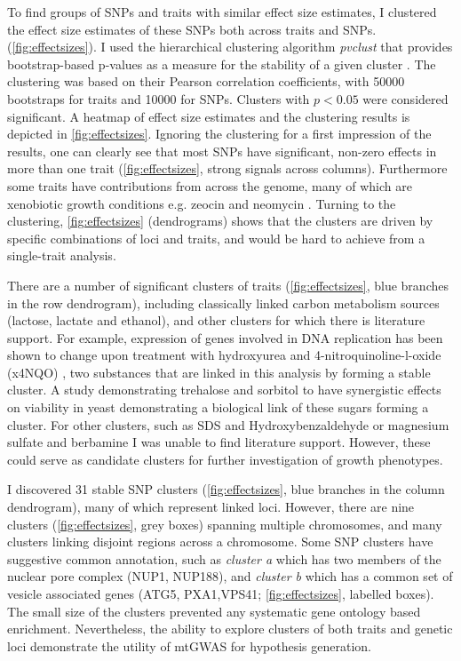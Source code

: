 To find groups of SNPs and traits with similar effect size estimates, I clustered the effect size estimates of these SNPs both across traits and SNPs. (\cref{fig:effectsizes}). I used the hierarchical clustering algorithm \textit{pvclust} that provides bootstrap-based p-values as a measure for the stability of a given cluster \citep{Suzuki2006}. The clustering was based on their Pearson correlation coefficients, with \num{50000} bootstraps for traits and \num{10000} for SNPs. Clusters with \(p < 0.05\) were considered significant. A heatmap of effect size estimates and the clustering results is depicted in \cref{fig:effectsizes}. Ignoring the clustering for a first impression of the results, one can clearly see that most SNPs have significant, non-zero effects in more than one trait (\cref{fig:effectsizes}, strong signals across columns). Furthermore some traits have contributions from across the genome, many of which are xenobiotic growth conditions e.g. zeocin \citep{Krol2015} and neomycin \citep{Foiani2010}. Turning to the clustering, \cref{fig:effectsizes} (dendrograms) shows that the clusters are driven by specific combinations of loci and traits, and would be hard to achieve from a single-trait analysis. 

There are a number of significant clusters of traits (\cref{fig:effectsizes}, blue branches in the row dendrogram), including classically linked carbon metabolism sources (lactose, lactate and ethanol), and other clusters for which there is literature support. For example, expression of genes involved in DNA replication has been shown to change upon treatment with hydroxyurea and \num{4}-nitroquinoline-l-oxide (x4NQO) \citep{Elledge1990}, two substances that are linked in this analysis by forming a stable cluster. A study demonstrating trehalose and sorbitol to have synergistic effects on viability in yeast \citep{Hua2015} demonstrating a biological link of these sugars forming a cluster. For other clusters, such as SDS and Hydroxybenzaldehyde or magnesium sulfate and berbamine I was unable to find literature support. However, these could serve as candidate clusters for further investigation of growth phenotypes.

I discovered \num{31} stable SNP clusters (\cref{fig:effectsizes}, blue branches in the column dendrogram), many of which represent linked loci. However, there are nine clusters (\cref{fig:effectsizes}, grey boxes) spanning multiple chromosomes, and many clusters linking disjoint regions across a chromosome. Some SNP clusters have suggestive common annotation, such as \textit{cluster a} which has two members of the nuclear pore complex (NUP1, NUP188), and \textit{cluster b} which has a common set of vesicle associated genes (ATG5, PXA1,VPS41; \cref{fig:effectsizes}, labelled boxes). The small size of the clusters prevented any systematic gene ontology based enrichment. Nevertheless, the ability to explore clusters of both traits and genetic loci demonstrate the utility of mtGWAS for hypothesis generation.

